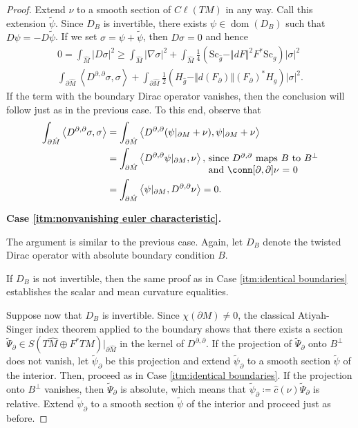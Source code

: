 \documentclass[12pt, reqno]{amsart}
\theoremstyle{plain} %
\theoremstyle{definition}
\theoremstyle{remark}
\numberwithin{equation}{section}
\newcommand{\dom}[1]{\hat{#1}}
\newcommand{\onorm}[1]{\Vert #1 \Vert}
\newcommand{\pnorm}[1]{| #1 |}
\newcommand{\bnd}[1]{\partial #1}
\newcommand{\cbar}[1]{\dom{c}\left(#1\right)}
\newcommand{\Sc}{\mathrm{Sc}}
\newcommand{\Cl}{C\ell}
\DeclareMathOperator{\operdom}{dom}
\begin{document}
\begin{proof}
    Extend \(\nu\) to a smooth section of \(\Cl(TM)\) in any way.
    Call this extension \(\widetilde{\psi}\).
    Since \(D_B\) is invertible, there exists \(\psi \in \operdom(D_B)\) such that \(D\psi = -D\widetilde{\psi}\).
    If we set \(\sigma = \psi + \widetilde{\psi}\), then \(D\sigma = 0\) and hence
    \begin{multline*}
        0 = \int_{\dom{M}} \pnorm{D\sigma}^2 \geq \int_{\dom{M}} \pnorm{\nabla \sigma}^2 + \int_{\dom{M}} \frac{1}{4}(\Sc_{\dom{g}} - \onorm{dF}^2 F^*\Sc_g) \pnorm{\sigma}^2 \\
        \int_{ \bnd{\dom{M}} } \left< D^{\partial, \partial} \sigma,\sigma \right> + \int_{ \bnd{\dom{M}} } \frac{1}{2}(H_{\dom{g}} - \onorm{d(F_\partial)} (F_\partial)^*H_g)\pnorm{\sigma}^2.
    \end{multline*}
    If the term with the boundary Dirac operator vanishes, then the conclusion will follow just as in the previous case.
    To this end, observe that
    \begin{align*}
        \int_{ \bnd{\dom{M}} } \left< D^{\partial,\partial} \sigma,\sigma \right> &= \int_{ \bnd{\dom{M}} } \left< D^{\partial,\partial} (\psi|_{\bnd{M}} + \nu), \psi|_{\bnd{M}} + \nu \right>\\
        &= \int_{ \bnd{\dom{M}} } \left< D^{\partial,\partial} \psi|_{\bnd{M}}, \nu \right>,\, \parbox[t]{4cm}{since \(D^{\partial,\partial}\) maps \(B\) to \(B^{\perp}\) and \(\conn[\partial, \partial] \nu\) = 0}\\
        &= \int_{ \bnd{\dom{M}} } \left< \psi|_{\bnd{M}}, D^{\partial,\partial} \nu \right> = 0.
    \end{align*}

    \textbf{Case \ref{itm:nonvanishing euler characteristic}.}

    The argument is similar to the previous case.
    Again, let \(D_B\) denote the twisted Dirac operator with absolute boundary condition \(B\).

    If \(D_B\) is not invertible, then the same proof as in Case \ref{itm:identical boundaries} establishes the scalar and mean curvature equalities.

    Suppose now that \(D_B\) is invertible.
    Since \(\chi(\bnd{M}) \ne 0\), the classical Atiyah-Singer index theorem applied to the boundary shows that there exists a section \(\widetilde{\Psi}_{\partial} \in S(T\dom{M} \oplus F^*TM)|_{\bnd{\dom{M}}}\) in the kernel of \(D^{\partial, \partial}\).
    If the projection of \(\widetilde{\Psi}_{\partial}\) onto \(B^{\perp}\) does not vanish, let \(\widetilde{\psi}_{\partial}\) be this projection and extend \(\widetilde{\psi}_{\partial}\) to a smooth section \(\widetilde{\psi}\) of the interior.
    Then, proceed as in Case \ref{itm:identical boundaries}.
    If the projection onto \(B^{\perp}\) vanishes, then \(\widetilde{\Psi}_{\partial}\) is absolute, which means that \(\widetilde{\psi}_{\partial} \coloneqq \cbar{\dom{\nu}} \widetilde{\Psi}_{\partial}\) is relative.
    Extend \(\widetilde{\psi}_\partial\) to a smooth section \(\widetilde{\psi}\) of the interior and proceed just as before.


\end{proof}
\end{document}
